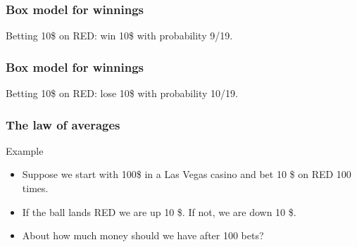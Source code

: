 \documentclass[handout]{beamer}
\begin{document}
   \begin{frame}
   \frametitle{Box model for winnings}
   \begin{center}
   \end{center}
   Betting 10\$ on {\color{red} RED}: win 10\$ with probability 9/19.
   \end{frame}



   \begin{frame}
   \frametitle{Box model for winnings}
   \begin{center}
   \end{center}
   Betting 10\$ on {\color{red} RED}: lose 10\$ with probability 10/19.
   \end{frame}


   \begin{frame} \frametitle{The law of averages}

   \begin{block}
   {Example}
   \begin{itemize}
   \item Suppose we start with 100\$ in
   a Las Vegas casino and bet 10 \$ on {\color{red} RED} 100 times.
   \item If the ball lands  {\color{red} RED} we are up 10 \$. If not,
   we are down 10 \$.
   \item About how much money should we have after 100 bets?
   \end{itemize}
   \end{block}
   \end{frame}
\end{document}
